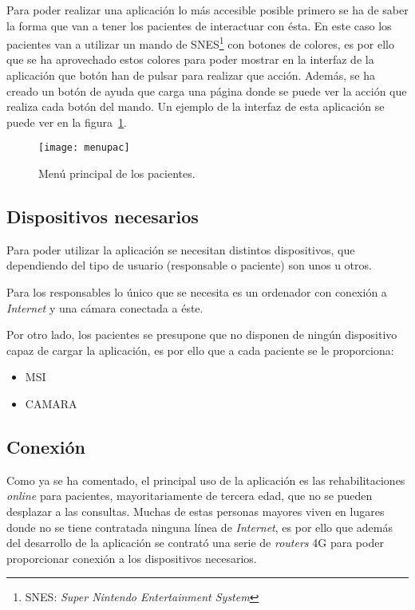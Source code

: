Para poder realizar una aplicación lo más accesible posible primero se ha de saber la forma que van a tener los pacientes de interactuar con ésta. En este caso los pacientes van a utilizar un mando de SNES\footnote{SNES: \textit{Super Nintendo Entertainment System}} con botones de colores, es por ello que se ha aprovechado estos colores para poder mostrar en la interfaz de la aplicación que botón han de pulsar para realizar que acción. Además, se ha creado un botón de ayuda que carga una página donde se puede ver la acción que realiza cada botón del mando. Un ejemplo de la interfaz de esta aplicación se puede ver en la figura~\ref{fig:menupaciente}.

\begin{figure}[h]
	\centering
	\texttt{[image: menupac]}
	\caption{Menú principal de los pacientes.}
	\label{fig:menupaciente}
\end{figure}

\subsection{Dispositivos necesarios}
Para poder utilizar la aplicación se necesitan distintos dispositivos, que dependiendo del tipo de usuario (responsable o paciente) son unos u otros.

Para los responsables lo único que se necesita es un ordenador con conexión a \textit{Internet} y una cámara conectada a éste.

Por otro lado, los pacientes se presupone que no disponen de ningún dispositivo capaz de cargar la aplicación, es por ello que a cada paciente se le proporciona:
\begin{itemize}
	\item MSI
	\item CAMARA
\end{itemize}

\subsection{Conexión}
Como ya se ha comentado, el principal uso de la aplicación es las rehabilitaciones \textit{online} para pacientes, mayoritariamente de tercera edad, que no se pueden desplazar a las consultas. Muchas de estas personas mayores viven en lugares donde no se tiene contratada ninguna línea de \textit{Internet}, es por ello que además del desarrollo de la aplicación se contrató una serie de \textit{routers} 4G para poder proporcionar conexión a los dispositivos necesarios. 

